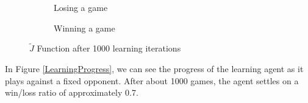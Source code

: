 \documentclass[11pt]{article}
\begin{document}
\begin{figure}[htbp]
  \begin{subfigure}{0.45\textwidth}
    \centering
    \caption{Losing a game}
    \label{fig:learned_j_lost}
  \end{subfigure}
  \hspace{1em}
  \begin{subfigure}{0.45\textwidth}
    \centering
    \caption{Winning a game}
    \label{fig:learned_j_win}
  \end{subfigure}
  \caption{$\tilde{J}$ Function after 1000 learning iterations}
  \label{fig:learned_j}
\end{figure}

In Figure \ref{LearningProgress}, we can see the progress of the learning
agent as it plays against a fixed opponent. After about 1000 games, the agent
settles on a win/loss ratio of approximately 0.7. 


\clearpage
\end{document}
